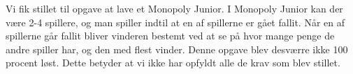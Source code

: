 \begin{flushleft} %
\doublespacing


Vi fik stillet til opgave at lave et Monopoly Junior. I Monopoly Junior kan der være 2-4 spillere, og man spiller indtil at en af spillerne er gået fallit. Når en af spillerne går fallit bliver vinderen bestemt ved at se på hvor mange penge de andre spiller har, og den med flest vinder. 
\addlinespace %
\addlinespace
Denne opgave blev desværre ikke 100 procent løst. Dette betyder at vi ikke har opfyldt alle de krav som blev stillet. 



\end{flushleft}